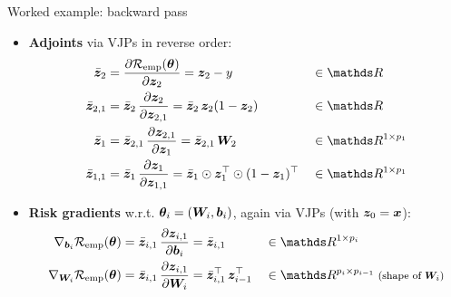\documentclass[11pt,compress,t,notes=noshow, xcolor=table]{beamer}
\newcommand{\zv}{\bm{z}}                 %
\newcommand{\adj}[1]{\bar{\bm{z}}_{#1}}  %
\begin{document}
\begin{framev}{Worked example: backward pass}
\begin{itemize}
\item \textbf{Adjoints} via VJPs in reverse order:
\vspace{-0.6em}
\begin{align*}
\adj{2} &= \pd{\risket}{\zv_2} = \zv_2 - y && \in \R \\
\adj{2,1} &= \adj{2} \, \pd{\zv_2}{\zv_{2,1}} = \adj{2} \, \zv_2 (1 - \zv_2) && \in \R \\
\adj{1} &= \adj{2,1} \, \pd{\zv_{2,1}}{\zv_1} = \adj{2,1} \, \bm{W}_2 && \in \R^{1 \times p_1} \\
\adj{1,1} &= \adj{1} \, \pd{\zv_1}{\zv_{1,1}} = \adj{1} \odot \zv_1^\top \odot (1 - \zv_1)^\top && \in \R^{1 \times p_1}
\end{align*}
\item \textbf{Risk gradients} w.r.t. $\bm{\theta}_i = (\bm{W}_i, \bm{b}_i)$, again via VJPs (with $\zv_0 = \xv$):
\vspace{-0.6em}
\begin{align*}
\nabla_{\bm{b}_i} \risket &= \adj{i,1} \, \pd{\zv_{i,1}}{\bm{b}_i} = \adj{i,1} && \in \R^{1 \times p_i} \\
\nabla_{\bm{W}_i} \risket &= \adj{i,1} \, \pd{\zv_{i,1}}{\bm{W}_i} = \adj{i,1}^\top \, \zv_{i-1}^\top && \in \R^{p_i \times p_{i-1}} \; \text{\footnotesize(shape of $\bm{W}_i$)}
\end{align*}
\end{itemize}
\end{framev}



\endlecture
\end{document}
